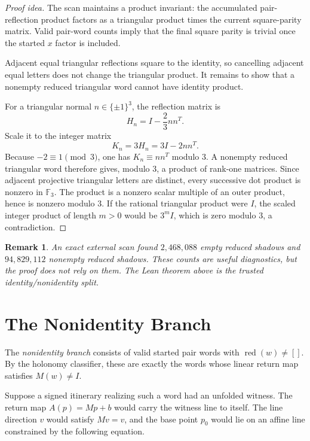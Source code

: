 \documentclass[11pt]{article}
\newtheorem{remark}[theorem]{Remark}
\newcommand{\red}{\operatorname{red}}
\begin{document}
\begin{proof}[Proof idea]
The scan maintains a product invariant: the accumulated pair-reflection
product factors as a triangular product times the current square-parity
matrix.  Valid pair-word counts imply that the final square parity is
trivial once the started \(x\) factor is included.

Adjacent equal triangular reflections square to the identity, so cancelling
adjacent equal letters does not change the triangular product.  It remains to
show that a nonempty reduced triangular word cannot have identity product.

For a triangular normal \(n\in\{\pm1\}^3\), the reflection matrix is
\[
  H_n=I-\frac{2}{3}nn^T.
\]
Scale it to the integer matrix
\[
  K_n=3H_n=3I-2nn^T.
\]
Because \(-2\equiv1\pmod 3\), one has \(K_n\equiv nn^T\) modulo \(3\).  A
nonempty reduced triangular word therefore gives, modulo \(3\), a product of
rank-one matrices.  Since adjacent projective triangular letters are
distinct, every successive dot product is nonzero in \(\mathbb F_3\).  The
product is a nonzero scalar multiple of an outer product, hence is nonzero
modulo \(3\).  If the rational triangular product were \(I\), the scaled
integer product of length \(m>0\) would be \(3^mI\), which is zero modulo
\(3\), a contradiction.
\end{proof}

\begin{remark}
An exact external scan found \(2{,}468{,}088\) empty reduced shadows and
\(94{,}829{,}112\) nonempty reduced shadows.  These counts are useful
diagnostics, but the proof does not rely on them.  The Lean theorem above is
the trusted identity/nonidentity split.
\end{remark}

\section{The Nonidentity Branch}
\label{sec:nonidentity}

The \emph{nonidentity branch} consists of valid started pair words with
\(\red(w)\ne[]\).  By the holonomy classifier, these are exactly the words
whose linear return map satisfies \(M(w)\ne I\).

Suppose a signed itinerary realizing such a word had an unfolded witness.
The return map \(A(p)=Mp+b\) would carry the witness line to itself.  The line
direction \(v\) would satisfy \(Mv=v\), and the base point \(p_0\) would lie
on an affine line constrained by the following equation.
\end{document}
